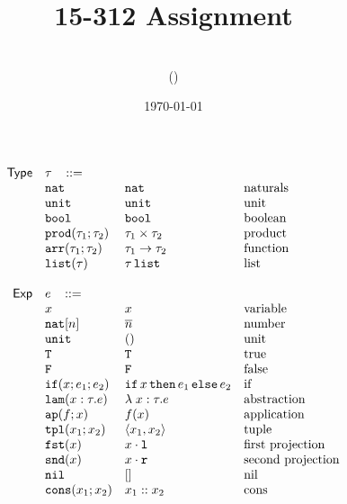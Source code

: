 \documentclass[11pt]{article}
\title{15-312 Assignment \hwnumber}
\author{\myname\\(\myandrewid)}
\date{\today}
\newcommand{\ms}[1]{\ensuremath{\mathsf{#1}}}
\newcommand{\irl}[1]{\mathtt{#1}}
\begin{document}
\maketitle

\[
\begin{array}{r l l l l}
\ms{Type} & \tau \,\,\,\,\, ::= \\
	& \irl{nat}                	 			& \irl{nat}											& \text{naturals}\\
	& \unittyabt                	 			& \unittycst										& \text{unit}\\
  & \booltyabt                       & \booltycst                    & \text{boolean}\\
  & \prodtyabt{\tau_1}{\tau_2}       & \prodtycst{\tau_1}{\tau_2}    & \text{product}\\
	&\irl{arr}(\tau_1;\tau_2) 				& \arrtycst{\tau_1}{\tau_2} 									& \text{function}\\
  &\listtyabt{\tau}		& \listtycst{\tau}											& \text{list}\\
	 \\
\ms{Exp}
        & e   \,\,\,\,\, ::= \\
 	& x                                			& x 												& \text{variable}\\
  & \irl{nat}[n]							& \numeral{n}												& \text{number}\\
  & \irl{unit}							& ()												& \text{unit}\\
  & \irl{T}							& \irl{T}												& \text{true}\\
  & \irl{F}	   					& \irl{F}												& \text{false}\\
  & \ifexabt{x}{e_1}{e_2} & \ifexcst{x}{e_1}{e_2}  & \text{if}\\
  & \irl{lam}(x:\tau.e) 						&\lambda \; x : \tau. e 		& \text{abstraction}\\
  & \irl{ap}(f;x) 					& \appcst{f}{x} 										& \text{application}\\
  & \irl{tpl}(x_1;x_2)     	& \pairexcst{x_1}{x_2}                									& \text{tuple}\\
 	& \irl{fst}(x)					& \fstexcst{x}   										& \text{first projection}\\
 	& \irl{snd}(x)					& \sndexcst{x}   										& \text{second projection}\\
 	& \nilexabt					& []   										& \text{nil}\\
 	& \consexabt{x_1}{x_2}					& x_1::x_2   										& \text{cons}\\

\end{array}\]
\end{document}
